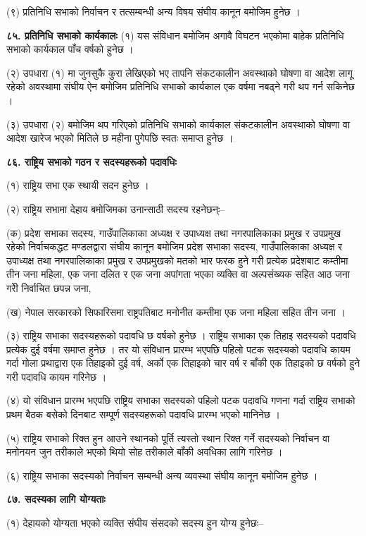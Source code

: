 (९) प्रतिनिधि सभाको निर्वाचन र तत्सम्बन्धी अन्य विषय संघीय कानून बमोजिम हुनेछ ।

\textbf{८५. प्रतिनिधि सभाको कार्यकालः} (१) यस संविधान बमोजिम अगावै विघटन भएकोमा बाहेक प्रतिनिधि सभाको कार्यकाल पाँच वर्षको हुनेछ ।

(२) उपधारा (१) मा जुनसुकै कुरा लेखिएको भए तापनि संकटकालीन अवस्थाको घोषणा वा आदेश लागू रहेको अवस्थामा संघीय ऐन बमोजिम प्रतिनिधि सभाको कार्यकाल एक वर्षमा नबढ्ने गरी थप गर्न सकिनेछ ।

(३) उपधारा (२) बमोजिम थप गरिएको प्रतिनिधि सभाको कार्यकाल संकटकालीन अवस्थाको घोषणा वा आदेश खारेज भएको मितिले छ महीना पुगेपछि स्वतः समाप्त हुनेछ ।

\textbf{८६. राष्ट्रिय सभाको गठन र सदस्यहरूको पदावधिः}

(१) राष्ट्रिय सभा एक स्थायी सदन हुनेछ ।

(२) राष्ट्रिय सभामा देहाय बमोजिमका उनान्साठी सदस्य रहनेछन्ः–

(क) प्रदेश सभाका सदस्य, गाउँपालिकाका अध्यक्ष र उपाध्यक्ष तथा नगरपालिकाका प्रमुख र उपप्रमुख रहेको निर्वाचकद्धट मण्डलद्वारा संघीय कानून बमोजिम प्रदेश सभाका सदस्य, गाउँपालिकाका अध्यक्ष र उपाध्यक्ष तथा नगरपालिकाका प्रमुख र उपप्रमुखको मतको भार फरक हुने गरी प्रत्येक प्रदेशबाट कम्तीमा तीन जना महिला, एक जना दलित र एक जना अपांगता भएका व्यक्ति वा अल्पसंख्यक सहित
आठ जना गरीे निर्वाचित छपन्न जना,

(ख) नेपाल सरकारको सिफारिसमा राष्ट्रपतिबाट मनोनीत कम्तीमा एक जना महिला सहित तीन जना ।

(३) राष्ट्रिय सभाका सदस्यहरूको पदावधि छ वर्षको हुनेछ । राष्ट्रिय सभाका एक तिहाइ सदस्यको पदावधि प्रत्येक दुई वर्षमा समाप्त हुनेछ ।
तर यो संविधान प्रारम्भ भएपछि पहिलो पटक सदस्यको पदावधि कायम गर्दा गोला प्रथाद्वारा एक तिहाइको दुई वर्ष, अर्को एक तिहाइको चार वर्ष र बाँकी एक तिहाइको छ वर्षको हुने गरी पदावधि कायम गरिनेछ ।

(४) यो संविधान प्रारम्भ भएपछि राष्ट्रिय सभाका सदस्यको पहिलो पटक पदावधि गणना गर्दा राष्ट्रिय सभाको प्रथम बैठक बसेको दिनबाट
सम्पूर्ण सदस्यहरूको पदावधि प्रारम्भ भएको मानिनेछ ।

(५) राष्ट्रिय सभाको रिक्त हुन आउने स्थानको पूर्ति त्यस्तो स्थान रिक्त गर्ने सदस्यको निर्वाचन वा मनोनयन जुन तरीकाले भएको थियो सोह तरीकाले बाँकी अवधिका लागि गरिनेछ ।

(६) राष्ट्रिय सभाका सदस्यको निर्वाचन सम्बन्धी अन्य व्यवस्था संघीय कानून बमोजिम हुनेछ ।

\textbf{८७. सदस्यका लागि योग्यताः}

(१) देहायको योग्यता भएको व्यक्ति संघीय संसदको सदस्य हुन योग्य हुनेछः–

